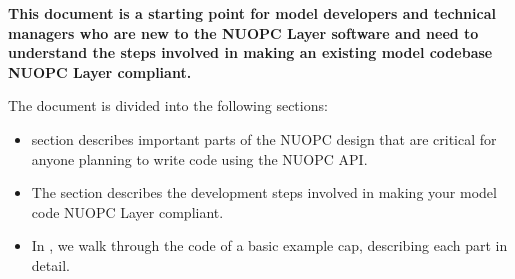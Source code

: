 \textbf{This document is a starting point for model developers
and technical managers who are new to the NUOPC Layer software
and need to understand the steps involved in making an existing
model codebase NUOPC Layer compliant.}

The document is divided into the following sections:
\begin{itemize}

\item {} section describes important parts of the NUOPC design that
are critical for anyone planning to write code using the NUOPC API.

\item The  section describes the development steps involved
in making your model code NUOPC Layer compliant.

\item In , we walk through the code of a basic example cap, describing 
each part in detail.

\end{itemize}


